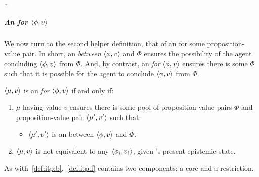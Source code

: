 \begin{note}
  \dots
\end{note}

\subparagraph*{An \itp{} for \(\langle \phi, v \rangle\)}

\begin{note}
  We now turn to the second helper definition, that of an  for some proposition-value pair.
  In short, an  \emph{between} \(\langle \phi, v \rangle\) and \(\Phi\) ensures the possibility of the agent concluding \(\langle \phi, v \rangle\) from \(\Phi\).
  And, by contrast, an  \emph{for} \(\langle \phi, v \rangle\) ensures there is some \(\Phi\) such that it is possible for the agent to conclude \(\langle \phi, v \rangle\) from \(\Phi\).
\end{note}

\begin{note}
  \begin{definition}
    \label{def:itp:f}
    \(\langle \mu, v \rangle\) is an \itp{} \emph{for} \(\langle \phi, v \rangle\) if and only if:
    \begin{enumerate}[label=\arabic*., ref=\named{I.f:\arabic*}]
    \item
      \label{def:itp:f:pR}
      \(\mu\) having value \(v\) ensures there is some pool of proposition-value pairs \(\Phi\) and proposition-value pair \(\langle \mu', v' \rangle\) such that:
      \begin{itemize}
      \item
        \(\langle \mu', v' \rangle\) is an \itp{} between \(\langle \phi, v \rangle\) and \(\Phi\).
      \end{itemize}
    \item
      \label{def:itp:f:distinct}
      \(\langle \mu, v \rangle\) is not equivalent to any \(\langle \phi_{i}, v_{i} \rangle\), given \vAgent{}'s present epistemic state.
    \end{enumerate}
    \vspace{-\baselineskip}
  \end{definition}
\end{note}

\begin{note}
  As with~\autoref{def:itp:b},~\autoref{def:itp:f} contains two components; a core and a restriction.
\end{note}

